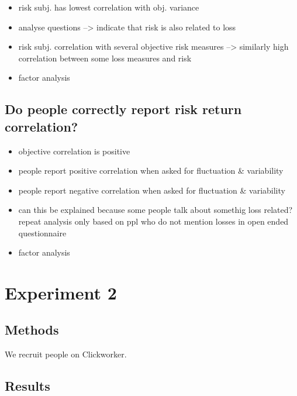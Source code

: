 \documentclass[a4paper,man, natbib,floatsintext]{apa6} %
\begin{document}
\begin{itemize}
\item risk subj. has lowest correlation with obj. variance
\item analyse questions --> indicate that risk is also related to loss
\item risk subj. correlation with several objective risk measures --> similarly high correlation between some loss measures and risk
\item factor analysis
\end{itemize}


\subsection{Do people correctly report risk return correlation?}
\begin{itemize}
\item objective correlation is positive
\item people report positive correlation when asked for fluctuation & variability
\item people report negative correlation when asked for fluctuation & variability
\item can this be explained because some people talk about somethig loss related? repeat analysis only based on ppl who do not mention losses in open ended questionnaire
\item factor analysis

\end{itemize}


\section{Experiment 2}
\subsection{Methods}
We recruit people on Clickworker. 

\subsection{Results}
\end{document}

